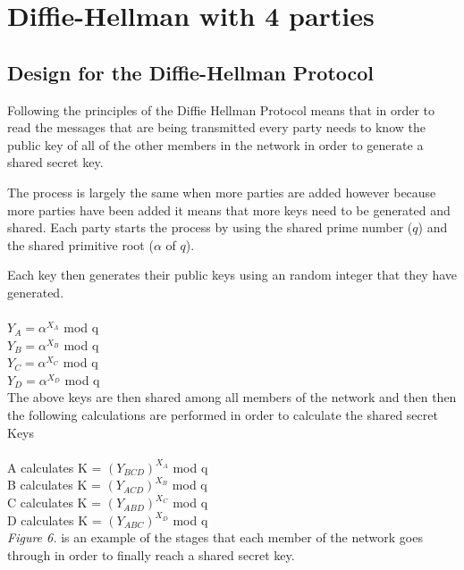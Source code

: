 \documentclass[a4paper, twoside, 11pt]{article}
\begin{document}
\section{Diffie-Hellman with 4 parties}
\subsection{Design for the Diffie-Hellman Protocol}
Following the principles of the Diffie Hellman Protocol means that in order
to read the messages that are being transmitted every party needs to know the
public key of all of the other members in the network in order to generate a shared secret key.

The process is largely the same when more parties are added however because more parties have been added it means that more keys need to be generated and shared. Each party starts the process by using the shared prime number ($q$) and the shared primitive root ($\alpha$ of $q$).

Each key then generates their public keys using an random integer that they have generated. \\
\\
$Y_A = \alpha^{X_A}$ mod q \\
$Y_B = \alpha^{X_B}$ mod q \\
$Y_C = \alpha^{X_C}$ mod q \\
$Y_D = \alpha^{X_D}$ mod q \\

The above keys are then shared among all members of the network and then
then the following calculations are performed in order to calculate the shared secret Keys\\
\\
A calculates K = $(Y_{BCD})^{X_A}$ mod q \\
B calculates K = $(Y_{ACD})^{X_B}$ mod q \\
C calculates K = $(Y_{ABD})^{X_C}$ mod q \\
D calculates K = $(Y_{ABC})^{X_D}$ mod q \\


\textit{Figure 6.} is an example of the stages that each member of the network goes through in order to finally reach a shared secret key. 
\end{document}
